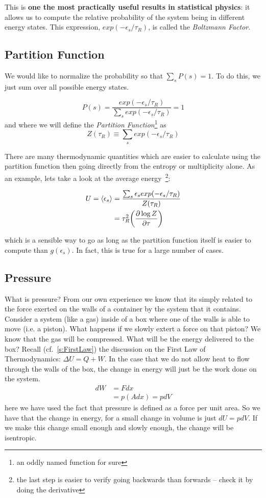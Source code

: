 This is \textbf{one the most practically useful results in statistical physics}: it allows us to compute the relative probability of the system being in different energy states. This expression, $exp(-\epsilon_s/\tau_R)$, is called the
\emph{Boltzmann Factor}.


\subsection{Partition Function}
We would like to normalize the probability so that 
$\sum_s P(s) = 1$. To do this, we just sum over all possible energy states.

\begin{equation}
P(s) = \frac{exp(-\epsilon_s/\tau_R)}{\sum_s exp(-\epsilon_s/\tau_R)} = 1
\end{equation}
and where we will define the \emph{Partition Function}\footnote{an oddly named function for sure} as
\begin{equation}
Z(\tau_R) \equiv \sum_s exp(-\epsilon_s/\tau_R)
\end{equation}

There are many thermodynamic quantities which are easier to calculate using the partition function then going directly from the entropy or multiplicity alone. As an example, lets take a look at the average energy~\footnote{the last step is easier
to verify going backwards than forwards -- check it by doing the derivative}:

\begin{align}
U = \Braket{\epsilon_s} &= 
\frac{\sum_s \epsilon_s exp(-\epsilon_s/\tau_R)}{Z(\tau_R)} \\
	&= \tau_R^2 \bigg(\frac{\partial \log Z}{\partial \tau}\bigg) 
\end{align}

which is a sensible way to go as long as the partition function itself is easier to compute than $g(\epsilon_s)$. In fact, this is true for a large number of cases.

\subsection{Pressure}
What is pressure? From our own experience we know that its simply related to the force exerted on the walls of a container by the system that it contains. Consider a system (like a gas) inside of a box where one of the walls is able to move (i.e. a piston). What happens if we slowly extert a force on that piston? We know that the gas will be compressed. What will be the energy delivered to the box? 
Recall (cf.~\ref{s:FirstLaw}) the discussion on the First Law of 
Thermodynamics: $\Delta U = Q + W$. In the case that we do not allow heat to flow through the walls of the box, the change in energy will just be the work done on the system.
\begin{align}
dW &= F dx \\
   &= p (A dx) = p dV
\end{align}
here we have used the fact that pressure is defined as a force per unit area.
So we have that the change in energy, for a small change in volume is just
$dU = p dV$. If we make this change small enough and slowly enough, the change will be isentropic.


